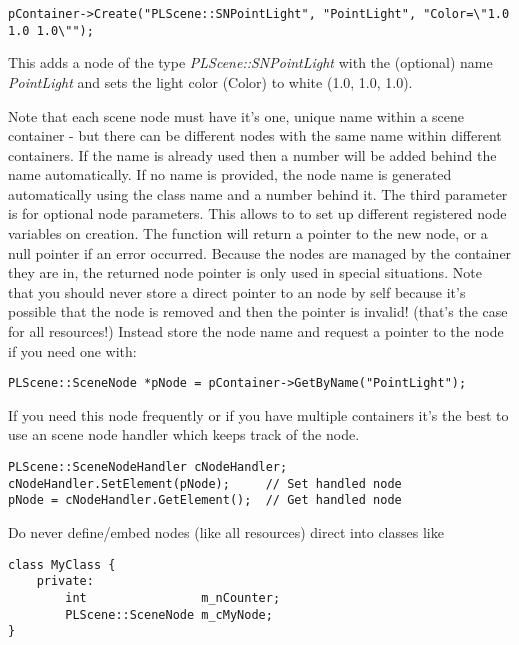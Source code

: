 \begin{lstlisting}[caption=Creating a new scene node instance]
pContainer->Create("PLScene::SNPointLight", "PointLight", "Color=\"1.0 1.0 1.0\"");
\end{lstlisting}

This adds a node of the type \emph{PLScene::SNPointLight} with the (optional) name \emph{PointLight} and sets the light color (Color) to white (1.0, 1.0, 1.0).

Note that each scene node must have it's one, unique name within a scene container - but there can be different nodes with the same name within different containers. If the name is already used then a number will be added behind the name automatically. If no name is provided, the node name is generated automatically using the class name and a number behind it. The third parameter is for optional node parameters. This allows to to set up different registered node variables on creation. The function will return a pointer to the new node, or a null pointer if an error occurred. Because the nodes are managed by the container they are in, the returned node pointer is only used in special situations. Note that you should never store a direct pointer to an node by self because it's possible that the node is removed and then the pointer is invalid! (that's the case for all resources!) Instead store the node name and request a pointer to the node if you need one with:

\begin{lstlisting}[caption=Requesting a scene node by name]
PLScene::SceneNode *pNode = pContainer->GetByName("PointLight");
\end{lstlisting}

If you need this node frequently or if you have multiple containers it's the best to use an scene node handler which keeps track of the node.

\begin{lstlisting}[caption=Scene node handler]
PLScene::SceneNodeHandler cNodeHandler;
cNodeHandler.SetElement(pNode);		// Set handled node
pNode = cNodeHandler.GetElement();	// Get handled node
\end{lstlisting}

Do never define/embed nodes (like all resources) direct into classes like

\begin{lstlisting}[caption=Invalid scene node instance usage]
class MyClass {
	private:
		int				   m_nCounter;
		PLScene::SceneNode m_cMyNode;
}
\end{lstlisting}

